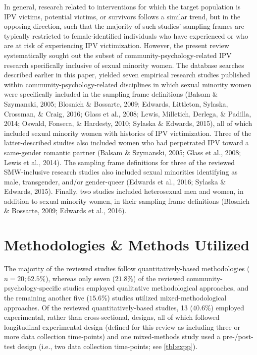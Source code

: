 \documentclass[11pt,]{tufte-book}
\begin{document}
In general, research related to interventions for which the target
population is IPV victims, potential victims, or survivors follows a
similar trend, but in the opposing direction, such that the majority of
such studies' sampling frames are typically restricted to
female-identified individuals who have experienced or who are at risk of
experiencing IPV victimization. However, the present review
systematically sought out the subset of community-psychology-related IPV
research specifically inclusive of sexual minority women. The database
searches described earlier in this paper, yielded seven empirical
research studies published within community-psychology-related
disciplines in which sexual minority women were specifically included in
the sampling frame definitions (Balsam \& Szymanski, 2005; Blosnich \&
Bossarte, 2009; Edwards, Littleton, Sylaska, Crossman, \& Craig, 2016;
Glass et al., 2008; Lewis, Milletich, Derlega, \& Padilla, 2014; Oswald,
Fonseca, \& Hardesty, 2010; Sylaska \& Edwards, 2015), all of which
included sexual minority women with histories of IPV victimization.
Three of the latter-described studies also included women who had
perpetrated IPV toward a same-gender romantic partner (Balsam \&
Szymanski, 2005; Glass et al., 2008; Lewis et al., 2014). The sampling
frame definitions for three of the reviewed SMW-inclusive research
studies also included sexual minorities identifying as male,
transgender, and/or gender-queer (Edwards et al., 2016; Sylaska \&
Edwards, 2015). Finally, two studies included heterosexual men and
women, in addition to sexual minority women, in their sampling frame
definitions (Blosnich \& Bossarte, 2009; Edwards et al., 2016).

\section{Methodologies \& Methods
Utilized}\label{methodologies-methods-utilized}

The majority of the reviewed studies follow quantitatively-based
methodologies (\(n = 20; 62.5\%\)), whereas only seven (\(21.8\%\)) of
the reviewed community-psychology-specific studies employed qualitative
methodological approaches, and the remaining another five (\(15.6\%\))
studies utilized mixed-methodological approaches. Of the reviewed
quantitatively-based studies, 13 (\(40.6\%\)) employed experimental,
rather than cross-sectional, designs, all of which followed longitudinal
experimental design (defined for this review as including three or more
data collection time-points) and one mixed-methods study used a
pre-/post-test design (i.e., two data collection time-points; see
\cref{tbl:expp}).
\end{document}
